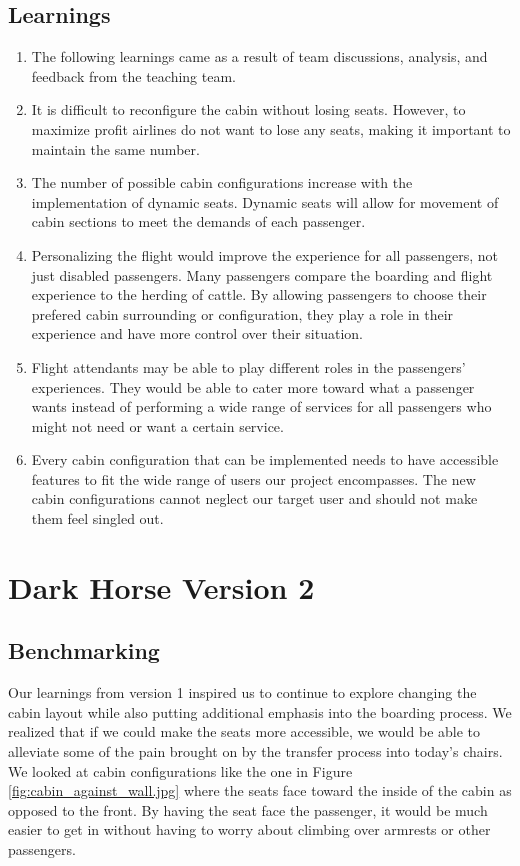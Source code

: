 \subsection{Learnings}
\begin{enumerate}
	\item The following learnings came as a result of team discussions, analysis, and feedback from the teaching team. 
	\item It is difficult to reconfigure the cabin without losing seats. However, to maximize profit airlines do not want to lose any seats, making it important to maintain the same number.
	\item The number of possible cabin configurations increase with the implementation of dynamic seats.  Dynamic seats will allow for movement of cabin sections to meet the demands of each passenger. 
	\item Personalizing the flight would improve the experience for all passengers, not just disabled passengers. Many passengers compare the boarding and flight experience to the herding of cattle. By allowing passengers to choose their prefered cabin surrounding or configuration, they play a role in their experience and have more control over their situation. 
	\item Flight attendants may be able to play different roles in the passengers’ experiences.  They would be able to cater more toward what a passenger wants instead of performing a wide range of services for all passengers who might not need or want a certain service. 
	\item Every cabin configuration that can be implemented needs to have accessible features to fit the wide range of users our project encompasses.  The new cabin configurations cannot neglect our target user and should not make them feel singled out. 
\end{enumerate}

\section{Dark Horse Version 2}
\subsection{Benchmarking}
Our learnings from version 1 inspired us to continue to explore changing the cabin layout while also putting additional emphasis into the boarding process. We realized that if we could make the seats more accessible, we would be able to alleviate some of the pain brought on by the transfer process into today’s chairs. We looked at cabin configurations like the one in Figure \ref{fig:cabin_against_wall.jpg} where the seats face toward the inside of the cabin as opposed to the front. By having the seat face the passenger, it would be much easier to get in without having to worry about climbing over armrests or other passengers. 

